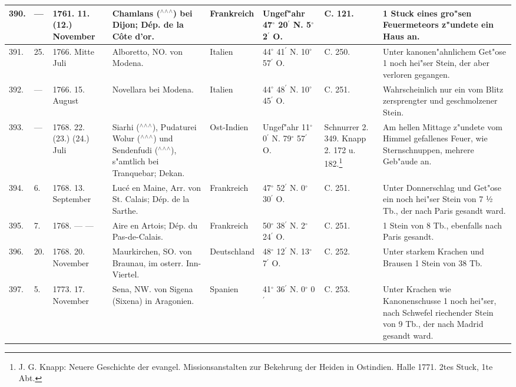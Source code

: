 \documentclass[a4paper, 8pt, oneside, polutonikogreek, german]{article}
\begin{document}
\begin{center}
\begin{longtable}{| p{5mm} | p{3mm} | p{15mm} | p{25mm} | p{20mm} | p{14mm} | p{17mm} | p{24mm} |}
        390. & --- & 1761. 11. (12.) November & Chamlans ($^\wedge$$^\wedge$$^\wedge$) bei Dijon; Dép. de la Côte d’or. & Frankreich & Ungef"ahr 47$^\circ$ 20$^\prime$ N. 5$^\circ$ 2$^\prime$ O. & C. 121. & 1 Stuck eines gro"sen Feuermeteors z"undete ein Haus an. \\ \hline
        391. & 25. & 1766. Mitte Juli & Alboretto, NO. von Modena. & Italien & 44$^\circ$ 41$^\prime$ N. 10$^\circ$ 57$^\prime$ O. & C. 250. & Unter kanonen"ahnlichem Get"ose 1 noch hei"ser Stein, der aber verloren gegangen. \\ \hline
        392. & --- & 1766. 15. August & Novellara bei Modena. & Italien & 44$^\circ$ 48$^\prime$ N. 10$^\circ$ 45$^\prime$ O. & C. 251. & Wahrscheinlich nur ein vom Blitz zersprengter und geschmolzener Stein. \\ \hline
        393. & --- & 1768. 22. (23.) (24.) Juli & Siarhi ($^\wedge$$^\wedge$$^\wedge$), Pudaturei Wolur ($^\wedge$$^\wedge$$^\wedge$) und Sendenfudi ($^\wedge$$^\wedge$$^\wedge$), s"amtlich bei Tranquebar; Dekan. & Ost-Indien & Ungef"ahr 11$^\circ$ 0$^\prime$ N. 79$^\circ$ 57$^\prime$ O. & Schnurrer 2. 349. Knapp 2. 172 u. 182.\footnote{J. G. Knapp: Neuere Geschichte der evangel. Missionsanstalten zur Bekehrung der Heiden in Ostindien. Halle 1771. 2tes Stuck, 1te Abt.} & Am hellen Mittage z"undete vom Himmel gefallenes Feuer, wie Sternschnuppen, mehrere Geb"aude an. \\ \hline
        394. & 6. & 1768. 13. September & Lucé en Maine, Arr. von St. Calais; Dép. de la Sarthe. & Frankreich & 47$^\circ$ 52$^\prime$ N. 0$^\circ$ 30$^\prime$ O. & C. 251. & Unter Donnerschlag und Get"ose ein noch hei"ser Stein von 7 ½ Tb., der nach Paris gesandt ward. \\ \hline
        395. & 7. & 1768. --- --- & Aire en Artois; Dép. du Pas-de-Calais. & Frankreich & 50$^\circ$ 38$^\prime$ N. 2$^\circ$ 24$^\prime$ O. & C. 251. & 1 Stein von 8 Tb., ebenfalls nach Paris gesandt. \\ \hline
        396. & 20. & 1768. 20. November & Maurkirchen, SO. von Braunau, im osterr. Inn-Viertel. & Deutschland & 48$^\circ$ 12$^\prime$ N. 13$^\circ$ 7$^\prime$ O. & C. 252. & Unter starkem Krachen und Brausen 1 Stein von 38 Tb. \\ \hline
        397. & 5. & 1773. 17. November & Sena, NW. von Sigena (Sixena) in Aragonien. & Spanien & 41$^\circ$ 36$^\prime$ N. 0$^\circ$ 0$^\prime$ & C. 253. & Unter Krachen wie Kanonenschusse 1 noch hei"ser, nach Schwefel riechender Stein von 9 Tb., der nach Madrid gesandt ward. \\ \hline

\end{longtable}
\end{center}
\end{document}
